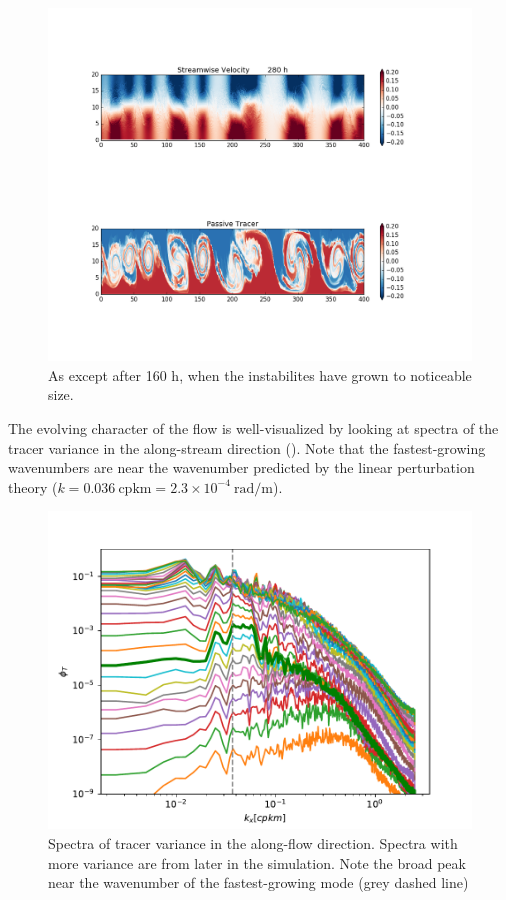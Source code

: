 \documentclass[11pt]{article}
\begin{document}
\begin{figure}[hbtp]
  \begin{center}
    \includegraphics[width=5in]{images/ChanPar040001008000}
  \end{center}
  \caption{As  except after 160 h, when the instabilites have grown to noticeable size.}
  \label{fig:ChanPar03}
\end{figure}
   
\clearpage

The evolving character of the flow is well-visualized by looking at spectra of the tracer variance in the along-stream direction ().  Note that the fastest-growing wavenumbers are near the wavenumber predicted by the linear perturbation theory ($k = 0.036\ \mathrm{cpkm} = 2.3\times10^{-4}\ \mathrm{rad/m}$).

\begin{figure}[hbtp]
  \begin{center}
    \includegraphics[width=5in]{images/ShearSpectra.pdf}
  \end{center}
  \caption{Spectra of tracer variance in the along-flow direction. Spectra with more variance are from later in the simulation.  Note the broad peak near the wavenumber of the fastest-growing mode (grey dashed line)}
  \label{fig:ShearSpectra}
\end{figure}
\end{document}
